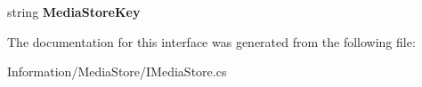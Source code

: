 \begin{DoxyCompactItemize}
\item 
\hypertarget{interface_snowflake_1_1_information_1_1_media_store_1_1_i_media_store_a025d3397b198dea6450ee0ca1de38d2f}{}string {\bfseries Media\+Store\+Key}\label{interface_snowflake_1_1_information_1_1_media_store_1_1_i_media_store_a025d3397b198dea6450ee0ca1de38d2f}

\end{DoxyCompactItemize}


The documentation for this interface was generated from the following file\+:\begin{DoxyCompactItemize}
\item 
Information/\+Media\+Store/I\+Media\+Store.\+cs\end{DoxyCompactItemize}
